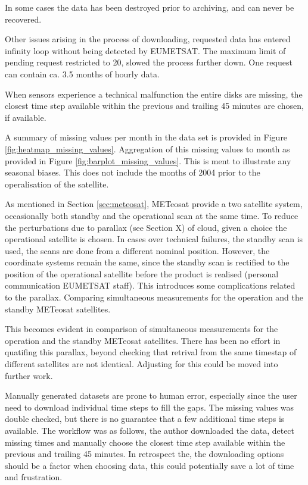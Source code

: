 In some cases the data has been destroyed prior to archiving, and can never be recovered. 

Other issues arising in the process of downloading, requested data has entered infinity loop without being detected by EUMETSAT. The maximum limit of  pending request restricted to 20, slowed the process further down. One request can contain ca. 3.5 months of hourly data. 

When sensors experience a technical malfunction the entire disks are missing, the closest time step available within the previous and trailing 45 minutes are chosen, if available. 

A summary of missing values per month in the data set is provided in Figure \ref{fig:heatmap_missing_values}. Aggregation of this missing values to month as provided in Figure \ref{fig:barplot_missing_values}. This is ment to illustrate any seasonal biases. This does not include the months of 2004 prior to the operalisation of the satellite.

As mentioned in Section \ref{sec:meteosat}, METeosat provide a two satellite system, occasionally both standby and the operational scan at the same time. To reduce the perturbations due to parallax (see Section X) of cloud, given a choice the operational satellite is chosen. In cases over technical failures, the standby scan is used, the scans are done from a different nominal position. However, the coordinate systems remain the same, since the standby scan is rectified to the position of the operational satellite before the product is realised (personal communication EUMETSAT staff). This introduces some complications related to the parallax. Comparing simultaneous measurements for the operation and the standby METeosat satellites.

This becomes evident in comparison of simultaneous measurements for the operation and the standby METeosat satellites. There has been no effort in quatifing this parallax, beyond checking that retrival from the same timestap of different satellites are not identical. Adjusting for this could be moved into further work. 

Manually generated datasets are prone to human error, especially since the user need to download individual time steps to fill the gaps. The missing values was double checked, but there is no guarantee that a few additional time steps is available. The workflow was as follows, the author downloaded the data, detect missing times and manually choose the closest time step available within the previous and trailing 45 minutes. 
In retrospect the, the downloading options should be a factor when choosing data, this could potentially save a lot of time and frustration.

